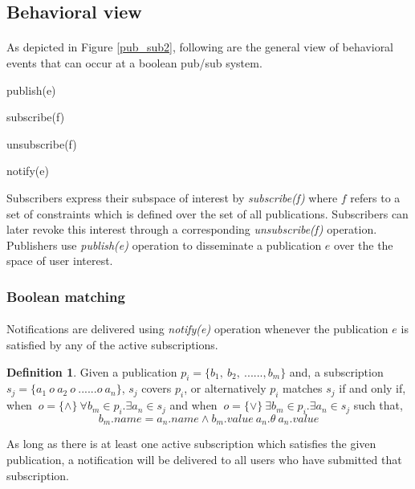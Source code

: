 \documentclass[a4paper,12pt,oneside]{book}
\theoremstyle{definition}
\newtheorem{definition}{Definition}[section]
\theoremstyle{remark}
\begin{document}
\subsection{Behavioral view}
\paragraph*{}
As depicted in Figure \ref{pub_sub2}, following are the general view of behavioral events that can occur at a boolean pub/sub system.
\begin{enumerate*}[label=(\roman*)]
\item publish(e)
\item subscribe(f)
\item unsubscribe(f)
\item notify(e)
\end{enumerate*}

Subscribers express their subspace of interest by \emph{subscribe(f)} where $f$ refers to a set of constraints which is defined over the set of all publications. Subscribers can later revoke this interest through a corresponding \emph{unsubscribe(f)} operation. Publishers use \emph{publish(e)} operation to disseminate a publication $e$ over the the space of user interest.\cite{Coulouris2005}

\subsubsection{Boolean matching}
\paragraph*{}
Notifications are delivered using \emph{notify(e)} operation whenever the publication $e$ is satisfied by any of the active subscriptions.

\begin{definition}
Given a publication $ p_i = \{ b_1,\ b_2,\ ......,b_m \} $ and, a subscription $ s_j = \{ a_1\ o\ a_2\ o\ ......o\ a_n \} $, $s_j$ covers $p_i$, or alternatively $p_i$ matches $s_j$ if and only if, when $\ o=\{\land\}\ \forall b_m \in p_i. \exists a_n \in s_j $ and when $\ o=\{\lor\}\ \exists b_m \in p_i. \exists a_n \in s_j $ such that,
\[ b_m.name=a_n.name \land b_m.value\ a_n.\theta\ a_n.value \]
\end{definition}

As long as there is at least one active subscription which satisfies the given publication, a notification will be delivered to all users who have submitted that subscription. 
\end{document}
